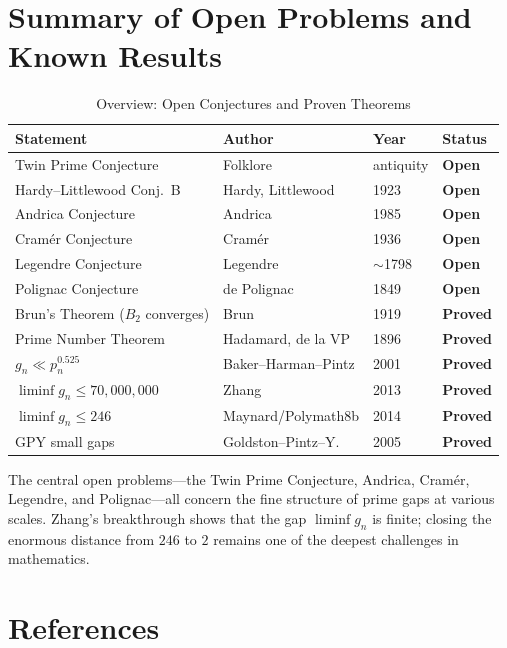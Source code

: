 \documentclass[12pt,a4paper]{amsart}
\theoremstyle{definition}
\begin{document}
\section{Summary of Open Problems and Known Results}

\begin{table}[h]
\centering
\caption{Overview: Open Conjectures and Proven Theorems}
\begin{tabular}{@{}llll@{}}
\toprule
Statement & Author & Year & Status \\
\midrule
Twin Prime Conjecture & Folklore & antiquity & \textbf{Open} \\
Hardy--Littlewood Conj.\ B & Hardy, Littlewood & 1923 & \textbf{Open} \\
Andrica Conjecture & Andrica & 1985 & \textbf{Open} \\
Cram\'{e}r Conjecture & Cram\'{e}r & 1936 & \textbf{Open} \\
Legendre Conjecture & Legendre & $\sim$1798 & \textbf{Open} \\
Polignac Conjecture & de Polignac & 1849 & \textbf{Open} \\
\midrule
Brun's Theorem ($B_2$ converges) & Brun & 1919 & \textbf{Proved} \\
Prime Number Theorem & Hadamard, de la VP & 1896 & \textbf{Proved} \\
$g_n \ll p_n^{0.525}$ & Baker--Harman--Pintz & 2001 & \textbf{Proved} \\
$\liminf g_n \leq 70{,}000{,}000$ & Zhang & 2013 & \textbf{Proved} \\
$\liminf g_n \leq 246$ & Maynard/Polymath8b & 2014 & \textbf{Proved} \\
GPY small gaps & Goldston--Pintz--Y. & 2005 & \textbf{Proved} \\
\bottomrule
\end{tabular}
\end{table}

The central open problems---the Twin Prime Conjecture, Andrica, Cram\'{e}r,
Legendre, and Polignac---all concern the fine structure of prime gaps at various
scales. Zhang's breakthrough shows that the gap $\liminf g_n$ is finite; closing
the enormous distance from $246$ to $2$ remains one of the deepest challenges in
mathematics.

\section*{References}
\end{document}
